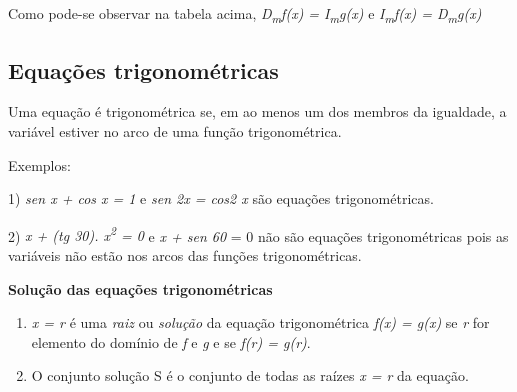 \begin{texemplo}
Como pode-se observar na tabela acima, \textit{D\textsubscript{m}f(x) = I\textsubscript{m}g(x)}  e \textit{I\textsubscript{m}f(x) = D\textsubscript{m}g(x)}  \qedsymbol
\end{texemplo}

\subsection{Equações trigonométricas}

\begin{caixa}
\begin{tdefinicao}
Uma equação é trigonométrica se, em ao menos um dos membros da igualdade, a variável estiver no arco de uma função trigonométrica.

Exemplos:

1) \textit{sen x + cos x = 1} e \textit{sen 2x = cos2 x} são equações trigonométricas.

2) \textit{x + (tg 30\degree). x\textsuperscript{2} = 0} e \textit{x + sen 60\degree} = 0  não são equações trigonométricas pois as variáveis não estão nos arcos das funções trigonométricas.
\end{tdefinicao}
\end{caixa}

\textbf{Solução das equações trigonométricas}

\begin{caixa}
\begin{enumerate}
    \item  \textit{x = r}  é uma \textit{raiz} ou \textit{solução} da equação trigonométrica \textit{f(x) = g(x)} se \textit{r} for elemento do domínio de \textit{f }e\textit{ g} e se \textit{f(r) = g(r)}.

    \item O conjunto solução S é o conjunto de todas as raízes  \textit{x = r}  da equação.
\end{enumerate}
\end{caixa}

